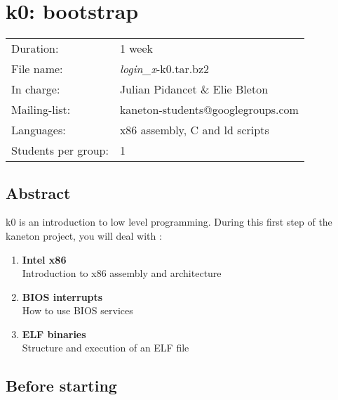 
%
%

\chapter{k0: bootstrap}

%
%

\begin{tabular}{p{7cm}l}
Duration: & 1 week \\
File name: & {\em login\_x}-k0.tar.bz2 \\
In charge: & Julian Pidancet \& Elie Bleton\\
Mailing-list: & kaneton-students@googlegroups.com \\
Languages: & x86 assembly, C and ld scripts \\
Students per group: & 1 \\
\end{tabular}

\section{Abstract}

k0 is an introduction to low level programming. During this first step of
the kaneton project, you will deal with :

\begin{enumerate}
  \item
    {\bf Intel x86}\\
    Introduction to x86 assembly and architecture\\
  \item
    {\bf BIOS interrupts}\\
    How to use BIOS services\\
  \item
    {\bf ELF binaries}\\
    Structure and execution of an ELF file\\
\end{enumerate}

\clearpage

\section{Before starting}

